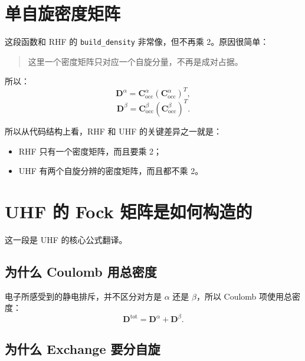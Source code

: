 \documentclass[UTF8,11pt,fontset=fandol]{ctexbook}
\begin{document}
\section{单自旋密度矩阵}



这段函数和 RHF 的 \texttt{build\_density} 非常像，但不再乘 2。原因很简单：

\begin{quote}
这里一个密度矩阵只对应一个自旋分量，不再是成对占据。
\end{quote}

所以：
\begin{equation}
\mathbf{D}^{\alpha}=\mathbf{C}^{\alpha}_{\mathrm{occ}}(\mathbf{C}^{\alpha}_{\mathrm{occ}})^T,
\end{equation}
\begin{equation}
\mathbf{D}^{\beta}=\mathbf{C}^{\beta}_{\mathrm{occ}}(\mathbf{C}^{\beta}_{\mathrm{occ}})^T.
\end{equation}

所以从代码结构上看，RHF 和 UHF 的关键差异之一就是：
\begin{itemize}
  \item RHF 只有一个密度矩阵，而且要乘 2；
  \item UHF 有两个自旋分辨的密度矩阵，而且都不乘 2。
\end{itemize}

\section{UHF 的 Fock 矩阵是如何构造的}



这一段是 UHF 的核心公式翻译。

\subsection*{为什么 Coulomb 用总密度}

电子所感受到的静电排斥，并不区分对方是 $\alpha$ 还是 $\beta$，所以 Coulomb 项使用总密度：
\begin{equation}
\mathbf{D}^{\mathrm{tot}}=\mathbf{D}^{\alpha}+\mathbf{D}^{\beta}.
\end{equation}

\subsection*{为什么 Exchange 要分自旋}
\end{document}
